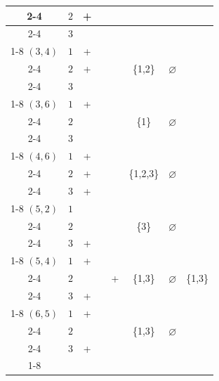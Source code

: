 \documentclass{article}
\begin{document}
\begin{center}
\begin{tabular}{|c|c||c|c|c||c|c|c|}
\cline{2-4}
& $2$ & + &  &  &  &  &  \\
\cline{2-4}
& $3$ & &  &  &  &  &  \\
\cline{1-8}
\multirow{3}{*}
{$(3, 4)$}& $1$ & + &  & \multirow{3}{*}{} & \multirow{3}{*}{\{1,2\}} & \multirow{3}{*}{$\varnothing$} & \multirow{3}{*}{} \\
\cline{2-4}
& $2$ & + &  &  &  &  &  \\
\cline{2-4}
& $3$ & &  &  &  &  &  \\
\cline{1-8}
\multirow{3}{*}
{$(3, 6)$}& $1$ & + &  & \multirow{3}{*}{} & \multirow{3}{*}{\{1\}} & \multirow{3}{*}{$\varnothing$} & \multirow{3}{*}{} \\
\cline{2-4}
& $2$ & &  &  &  &  &  \\
\cline{2-4}
& $3$ & &  &  &  &  &  \\
\cline{1-8}
\multirow{3}{*}
{$(4, 6)$}& $1$ & + &  & \multirow{3}{*}{} & \multirow{3}{*}{\{1,2,3\}} & \multirow{3}{*}{$\varnothing$} & \multirow{3}{*}{} \\
\cline{2-4}
& $2$ & + &  &  &  &  &  \\
\cline{2-4}
& $3$ & + &  &  &  &  &  \\
\cline{1-8}
\multirow{3}{*}
{$(5, 2)$}& $1$ & &  & \multirow{3}{*}{} & \multirow{3}{*}{\{3\}} & \multirow{3}{*}{$\varnothing$} & \multirow{3}{*}{} \\
\cline{2-4}
& $2$ & &  &  &  &  &  \\
\cline{2-4}
& $3$ & + &  &  &  &  &  \\
\cline{1-8}
\multirow{3}{*}
{$(5, 4)$}& $1$ & + &  & \multirow{3}{*}{+} & \multirow{3}{*}{\{1,3\}} & \multirow{3}{*}{$\varnothing$} & \multirow{3}{*}{\{1,3\}} \\
\cline{2-4}
& $2$ & &  &  &  &  &  \\
\cline{2-4}
& $3$ & + &  &  &  &  &  \\
\cline{1-8}
\multirow{3}{*}
{$(6, 5)$}& $1$ & + &  & \multirow{3}{*}{} & \multirow{3}{*}{\{1,3\}} & \multirow{3}{*}{$\varnothing$} & \multirow{3}{*}{} \\
\cline{2-4}
& $2$ & &  &  &  &  &  \\
\cline{2-4}
& $3$ & + &  &  &  &  &  \\
\cline{1-8}
\end{tabular}
\\
\bigskip

\end{center}
\end{document}
